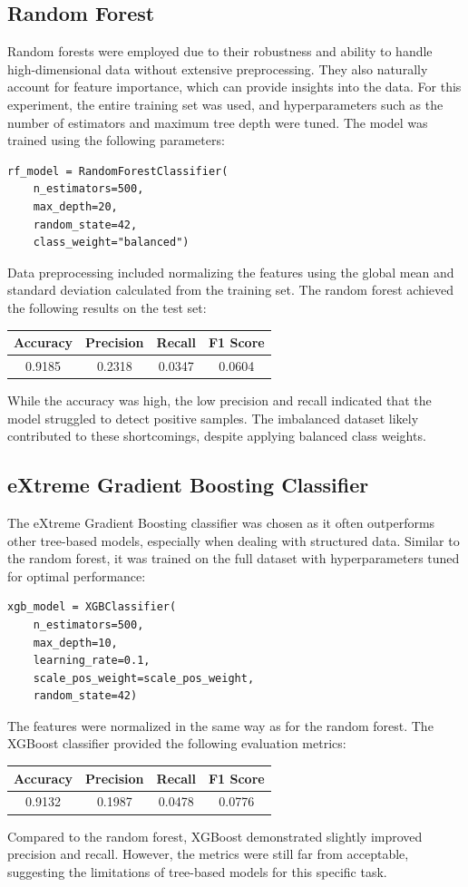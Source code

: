 \documentclass[conference,9pt]{IEEEtran}
\begin{document}
\subsection{Random Forest}
Random forests were employed due to their robustness and ability to handle high-dimensional data without extensive preprocessing. They also naturally account for feature importance, which can provide insights into the data. For this experiment, the entire training set was used, and hyperparameters such as the number of estimators and maximum tree depth were tuned.
The model was trained using the following parameters:
\begin{lstlisting}
rf_model = RandomForestClassifier(
	n_estimators=500,
	max_depth=20,
	random_state=42,
	class_weight="balanced")
\end{lstlisting}
Data preprocessing included normalizing the features using the global mean and standard deviation calculated from the training set. The random forest achieved the following results on the test set:
\begin{center}
    \begin{tabular}{c|c|c|c}
        Accuracy & Precision & Recall & F1 Score \\ 
        \hline 
        0.9185 & 0.2318 &  0.0347 & 0.0604\\
    \end{tabular}
\end{center}
While the accuracy was high, the low precision and recall indicated that the model struggled to detect positive samples. The imbalanced dataset likely contributed to these shortcomings, despite applying balanced class weights.

\subsection{eXtreme Gradient Boosting Classifier}

The eXtreme Gradient Boosting classifier was chosen as it often outperforms other tree-based models, especially when dealing with structured data. Similar to the random forest, it was trained on the full dataset with hyperparameters tuned for optimal performance:

\begin{lstlisting}
xgb_model = XGBClassifier(
    n_estimators=500,
    max_depth=10,
    learning_rate=0.1,
    scale_pos_weight=scale_pos_weight,
    random_state=42)
\end{lstlisting}
The features were normalized in the same way as for the random forest. The XGBoost classifier provided the following evaluation metrics:
\begin{center}
    \begin{tabular}{c|c|c|c}
        Accuracy & Precision & Recall & F1 Score \\ 
        \hline 
        0.9132 & 0.1987 &  0.0478 & 0.0776\\
    \end{tabular}
\end{center}
Compared to the random forest, XGBoost demonstrated slightly improved precision and recall. However, the metrics were still far from acceptable, suggesting the limitations of tree-based models for this specific task.
\end{document}
